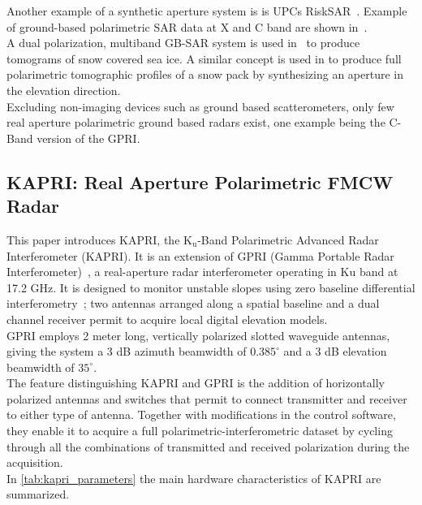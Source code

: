 Another example  of a synthetic aperture system is is UPCs RiskSAR~\cite{Iglesias2014, Aguasca2004,Pipia2007a,Pipia2009, Pipia2013,Iglesias2014}. Example of ground-based polarimetric SAR data at X and C band are shown in~\cite{Kang2009, Kang2010}.\\ A dual polarization, multiband GB-SAR system is used in~\cite{Yitayew2014} to produce tomograms of snow covered sea ice. A similar concept is used in\cite{Frey2015,Frey2016} to produce full polarimetric tomographic profiles of a snow pack by synthesizing an aperture in the elevation direction.\\
Excluding non-imaging devices such as ground based scatterometers, only few real aperture polarimetric ground based radars exist, one example being the C-Band version of the GPRI\cite{Cherukumilli2012}.
\subsection{KAPRI: Real Aperture Polarimetric FMCW Radar}
This paper introduces KAPRI, the $\mathrm{K_u}$-Band Polarimetric Advanced Radar Interferometer (KAPRI)\cite{Baffelli2016a}. It is an extension of GPRI (Gamma Portable Radar Interferometer)~\cite{werner_gpri_2012,Strozzi2011, Werner2008}, a real-aperture radar interferometer operating in Ku band at 17.2 GHz. It is designed 
to monitor unstable slopes using zero baseline differential interferometry~\cite{Massonnet1993}; two antennas arranged along a spatial baseline and a dual channel receiver permit to acquire local digital elevation models.\\
GPRI employs  2 meter long, vertically polarized slotted waveguide antennas, giving the system a 3 dB azimuth beamwidth of $0.385^\circ$ and a 3 dB elevation beamwidth of $35^\circ$.\\
The feature distinguishing KAPRI and GPRI is the addition of horizontally polarized antennas and switches that permit to connect transmitter and receiver to either type of antenna. Together with modifications in the control software, they enable it to acquire a full polarimetric-interferometric dataset by cycling through all the combinations of transmitted and received polarization during the acquisition.\\  In \autoref{tab:kapri_parameters} the main hardware characteristics of KAPRI are summarized.
